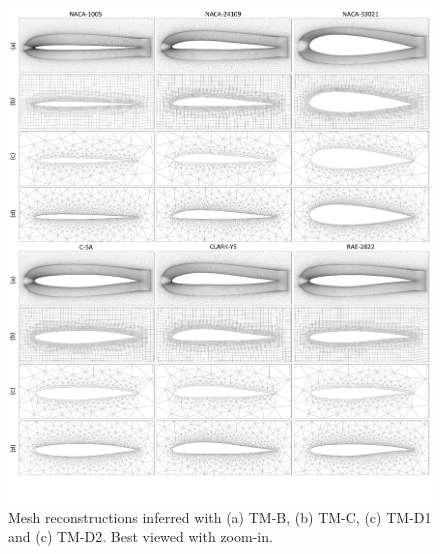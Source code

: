 \begin{figure}[!htbp]
	\begin{center}
		\includegraphics[width=1.02\linewidth]{chapter3/tex/figures/experiment/deformed_template_mesh.pdf}
	\end{center}
	\caption{
		\small Mesh reconstructions inferred with (a) TM-B, (b) TM-C, (c) TM-D1 and (c) TM-D2. Best viewed with zoom-in.
 	}
	\label{ch3:fig:discuss_template_res}
\end{figure}

